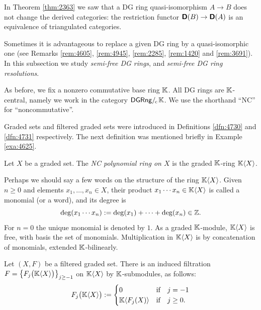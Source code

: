 \label{subsec:DG-ring-res}

In Theorem \ref{thm:2363} we saw that a DG ring quasi-isomorphism 
$A \to B$ does not change the derived categories: the restriction functor 
$\boldsymbol{\mathsf{D}}(B) \to \boldsymbol{\mathsf{D}}(A)$ is an equivalence of triangulated categories. 

Sometimes it is advantageous to replace a given DG ring by a quasi-isomorphic 
one (see Remarks \ref{rem:4605}, \ref{rem:4945}, \ref{rem:2285}, 
\ref{rem:1420} and \ref{rem:3691}). 
In this subsection we study {\em semi-free DG rings}, and 
{\em semi-free DG ring resolutions}. 

As before, we fix a nonzero commutative base ring $\mathbb{K}$.
All DG rings are $\mathbb{K}$-central, namely we work 
in the category $\mathrm{\mathsf{DGRng}} /_{\mspace{-2mu} \mathrm{c}} \mspace{2mu} \mathbb{K}$. We use the shorthand 
``NC'' for ``noncommutative''. 

Graded sets and filtered graded sets were introduced in Definitions 
\ref{dfn:4730} and \ref{dfn:4731} respectively. 
The next definition was mentioned briefly in Example \ref{exa:4625}.

\begin{dfn} \label{dfn:4306}
Let $X$ be a graded set. The {\em NC polynomial ring on $X$} is the graded 
$\mathbb{K}$-ring $\mathbb{K} \langle X \rangle$. 
\end{dfn}

Perhaps we should say a few words on the structure of the ring $\mathbb{K} \langle X \rangle$. 
Given $n \geq 0$ and elements 
$x_{1}, \ldots, x_{n} \in X$, their product
$x_{1} \cdots x_{n} \in \mathbb{K} \langle X \rangle$
is called a monomial (or a word), and its degree is 
\begin{equation} \label{eqn:4305}
\operatorname{deg}(x_{1} \cdots x_{n}) := \operatorname{deg}(x_{1}) + \cdots + 
\operatorname{deg}(x_{n}) \in \mathbb{Z} .
\end{equation}
For $n = 0$ the unique monomial is denoted by $1$. 
As a graded $\mathbb{K}$-module, $\mathbb{K} \langle X \rangle$ is free, with basis the set of 
monomials. Multiplication in $\mathbb{K} \langle X \rangle$ is by concatenation of monomials, 
extended $\mathbb{K}$-bilinearly. 

\begin{dfn} \label{dfn:4308}
Let $(X, F)$ be a filtered graded set. There is an induced filtration
$F = \bigl\{ F_{j} \bigl( \mathbb{K} \langle X \rangle \bigr) \bigr\}_{j \geq -1}$ on 
$\mathbb{K} \langle X \rangle$ by $\mathbb{K}$-submodules, as follows:
\[ F_j \bigl( \mathbb{K} \langle X \rangle \bigr) := 
\begin{cases}
0 & \textup{if} \quad j = -1 
\\
\mathbb{K} \langle F_j(X) \rangle & \textup{if} \quad j \geq 0  .   
\end{cases} \]
\end{dfn}

